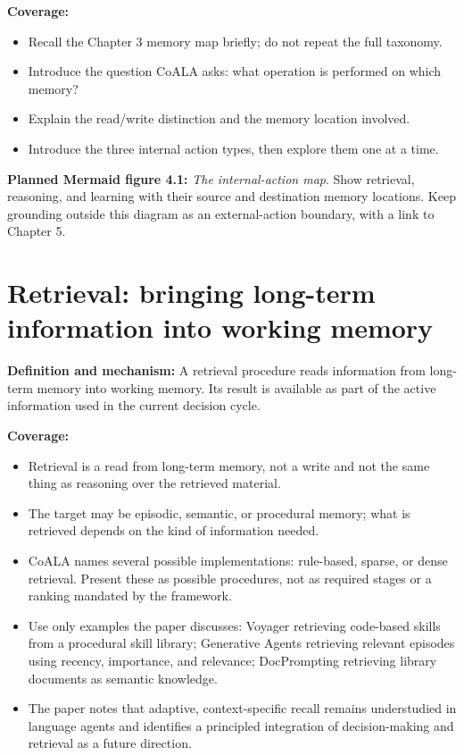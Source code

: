 \textbf{Coverage:}
\begin{itemize}
  \item Recall the Chapter 3 memory map briefly; do not repeat the full taxonomy.
  \item Introduce the question CoALA asks: what operation is performed on which memory?
  \item Explain the read/write distinction and the memory location involved.
  \item Introduce the three internal action types, then explore them one at a time.
\end{itemize}

\textbf{Planned Mermaid figure 4.1:} \emph{The internal-action map}. Show retrieval, reasoning, and learning with their source and destination memory locations. Keep grounding outside this diagram as an external-action boundary, with a link to Chapter 5.

\section{Retrieval: bringing long-term information into working memory}
\textbf{Definition and mechanism:} A retrieval procedure reads information from long-term memory into working memory. Its result is available as part of the active information used in the current decision cycle.

\textbf{Coverage:}
\begin{itemize}
  \item Retrieval is a read from long-term memory, not a write and not the same thing as reasoning over the retrieved material.
  \item The target may be episodic, semantic, or procedural memory; what is retrieved depends on the kind of information needed.
  \item CoALA names several possible implementations: rule-based, sparse, or dense retrieval. Present these as possible procedures, not as required stages or a ranking mandated by the framework.
  \item Use only examples the paper discusses: Voyager retrieving code-based skills from a procedural skill library; Generative Agents retrieving relevant episodes using recency, importance, and relevance; DocPrompting retrieving library documents as semantic knowledge.
  \item The paper notes that adaptive, context-specific recall remains understudied in language agents and identifies a principled integration of decision-making and retrieval as a future direction.
\end{itemize}

